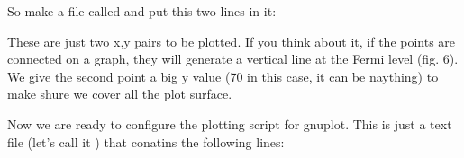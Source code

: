 \documentclass[letterpaper,10pt,english,openany,oneside]{sphinxmanual}
\begin{document}
\sphinxAtStartPar
So make a file called  and put this two lines in it:

\begin{sphinxVerbatim}[commandchars=\\\{\}]
 
 
\end{sphinxVerbatim}

\sphinxAtStartPar
These are just two x,y pairs to be plotted. If you think about it, if the points are connected on a graph, they will generate a vertical line at the Fermi level (fig. 6).
We give the second point a big y value (70 in this case, it can be naything) to make shure we cover all the plot surface.

\begin{figure}[htbp]
\centering

\noindent{}
\end{figure}

\sphinxAtStartPar
Now we are ready to configure the plotting script for gnuplot. This is just a text file (let’s call it ) that conatins the following lines:
\end{document}
